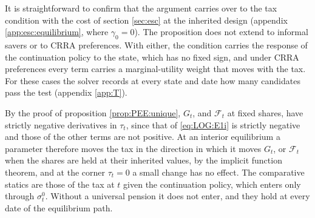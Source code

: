 \bigskip
It is straightforward to confirm that the argument carries over to the tax condition with the cost of section \ref{sec:esc} at the inherited design (appendix \ref{app:esc:equilibrium}, where $\gamma_0 = 0$). The proposition does not extend to informal savers or to CRRA preferences. With either, the condition carries the response of the continuation policy to the state, which has no fixed sign, and under CRRA preferences every term carries a marginal-utility weight that moves with the tax. For these cases the solver records at every state and date how many candidates pass the test (appendix \ref{app:T}).



 By the proof of proposition \ref{prop:PEE:unique}, $G_t$, and $\mathcal{F}_t$ at fixed shares, have strictly negative derivatives in $\tau_t$, since that of \eqref{eq:LOG:E1i} is strictly negative and those of the other terms are not positive. At an interior equilibrium a parameter therefore moves the tax in the direction in which it moves $G_t$, or $\mathcal{F}_t$ when the shares are held at their inherited values, by the implicit function theorem, and at the corner $\tau_t = 0$ a small change has no effect. The comparative statics are those of the tax at $t$ given the continuation policy, which enters only through $\sigma_t^0$. Without a universal pension it does not enter, and they hold at every date of the equilibrium path.

